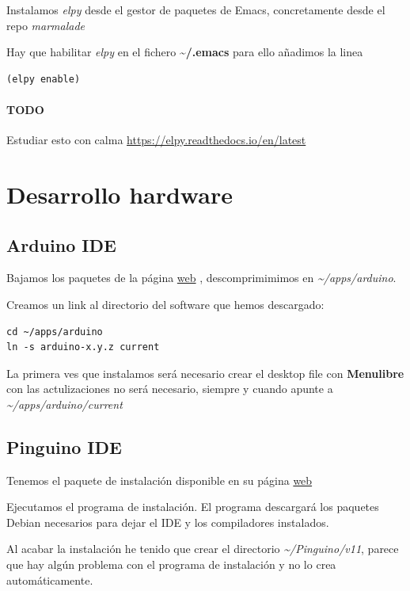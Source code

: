 \documentclass[12pt,spanish,]{article}
\let\oldparagraph\paragraph
\renewcommand{\paragraph}[1]{\oldparagraph{#1}\mbox{}}
\begin{document}
Instalamos \emph{elpy} desde el gestor de paquetes de Emacs,
concretamente desde el repo \emph{marmalade}

Hay que habilitar \emph{elpy} en el fichero
\textbf{\textasciitilde{}/.emacs} para ello añadimos la linea

\begin{verbatim}
(elpy enable)
\end{verbatim}

\paragraph{TODO}\label{todo}

Estudiar esto con calma \url{https://elpy.readthedocs.io/en/latest}

\section{Desarrollo hardware}\label{desarrollo-hardware}

\subsection{Arduino IDE}\label{arduino-ide}

Bajamos los paquetes de la página \href{https://www.arduino.cc}{web} ,
descomprimimimos en \emph{\textasciitilde{}/apps/arduino}.

Creamos un link al directorio del software que hemos descargado:

\begin{verbatim}
cd ~/apps/arduino
ln -s arduino-x.y.z current
\end{verbatim}

La primera ves que instalamos será necesario crear el desktop file con
\textbf{Menulibre} con las actulizaciones no será necesario, siempre y
cuando apunte a \emph{\textasciitilde{}/apps/arduino/current}

\subsection{Pinguino IDE}\label{pinguino-ide}

Tenemos el paquete de instalación disponible en su página
\href{http://pinguino.cc/download.php}{web}

Ejecutamos el programa de instalación. El programa descargará los
paquetes Debian necesarios para dejar el IDE y los compiladores
instalados.

Al acabar la instalación he tenido que crear el directorio
\emph{\textasciitilde{}/Pinguino/v11}, parece que hay algún problema con
el programa de instalación y no lo crea automáticamente.
\end{document}
